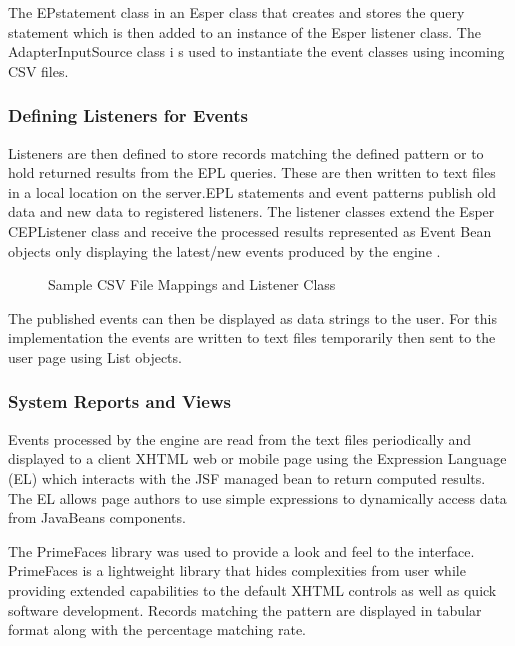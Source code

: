 \noindent The EPstatement class in an Esper class that creates and stores the query statement which is then added to an instance of the Esper listener class. The AdapterInputSource class i s used to instantiate the event classes using incoming CSV files.

\subsubsection{Defining Listeners for Events}

\noindent Listeners are then defined  to store records  matching the defined pattern or  to hold returned results from the EPL queries. These are then written to text files in a local location on the server.EPL statements and event patterns publish old data and new data to registered listeners. The listener classes extend the Esper CEPListener class and receive the processed results represented as Event Bean objects only displaying the latest/new events produced by the engine \cite{twentyfive}. 

\begin{center}
\begin{figure}[h]
\caption{Sample CSV File Mappings and Listener Class }

\end{figure}
\end{center}

\noindent The published events can then be displayed as data strings to the user. For this implementation the events are written to text files temporarily then sent to the user page using List objects.

\subsubsection{System Reports and Views}

\noindent Events processed by the engine are read from the text files periodically and displayed to a client XHTML web or mobile page using the Expression Language (EL) \cite{twentythree} which interacts with the JSF \cite{twentythree}  managed bean to return computed results. The EL allows page authors to use simple expressions to dynamically access data from JavaBeans components. 

\noindent The PrimeFaces library \cite{twentyfour} was used to provide a look and feel to the interface. PrimeFaces is a lightweight library that hides complexities from user while providing extended capabilities to the default XHTML controls as well as quick software development. Records matching the pattern are displayed in tabular format along with the percentage matching rate. 

